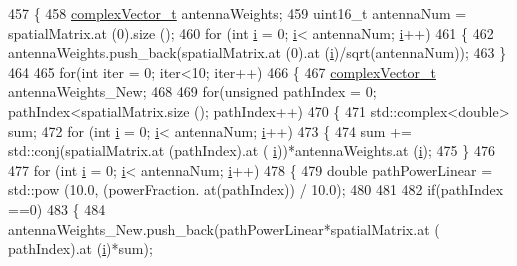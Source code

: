 \begin{DoxyCode}
457 \{
458         \hyperlink{namespacens3_a6a7f75817ae50e6ac47414955b17d926}{complexVector\_t} antennaWeights;
459         uint16\_t antennaNum = spatialMatrix.at (0).size ();
460         \textcolor{keywordflow}{for} (\textcolor{keywordtype}{int} \hyperlink{bernuolliDistribution_8m_a6f6ccfcf58b31cb6412107d9d5281426}{i} = 0; \hyperlink{bernuolliDistribution_8m_a6f6ccfcf58b31cb6412107d9d5281426}{i}< antennaNum; \hyperlink{bernuolliDistribution_8m_a6f6ccfcf58b31cb6412107d9d5281426}{i}++)
461         \{
462                 antennaWeights.push\_back(spatialMatrix.at (0).at (\hyperlink{bernuolliDistribution_8m_a6f6ccfcf58b31cb6412107d9d5281426}{i})/sqrt(antennaNum));
463         \}
464 
465         \textcolor{keywordflow}{for}(\textcolor{keywordtype}{int} iter = 0; iter<10; iter++)
466         \{
467                 \hyperlink{namespacens3_a6a7f75817ae50e6ac47414955b17d926}{complexVector\_t} antennaWeights\_New;
468 
469                 \textcolor{keywordflow}{for}(\textcolor{keywordtype}{unsigned} pathIndex = 0; pathIndex<spatialMatrix.size (); pathIndex++)
470                 \{
471                         std::complex<double> sum;
472                         \textcolor{keywordflow}{for} (\textcolor{keywordtype}{int} \hyperlink{bernuolliDistribution_8m_a6f6ccfcf58b31cb6412107d9d5281426}{i} = 0; \hyperlink{bernuolliDistribution_8m_a6f6ccfcf58b31cb6412107d9d5281426}{i}< antennaNum; \hyperlink{bernuolliDistribution_8m_a6f6ccfcf58b31cb6412107d9d5281426}{i}++)
473                         \{
474                                 sum += std::conj(spatialMatrix.at (pathIndex).at (
      \hyperlink{bernuolliDistribution_8m_a6f6ccfcf58b31cb6412107d9d5281426}{i}))*antennaWeights.at (\hyperlink{bernuolliDistribution_8m_a6f6ccfcf58b31cb6412107d9d5281426}{i});
475                         \}
476 
477                         \textcolor{keywordflow}{for} (\textcolor{keywordtype}{int} \hyperlink{bernuolliDistribution_8m_a6f6ccfcf58b31cb6412107d9d5281426}{i} = 0; \hyperlink{bernuolliDistribution_8m_a6f6ccfcf58b31cb6412107d9d5281426}{i}< antennaNum; \hyperlink{bernuolliDistribution_8m_a6f6ccfcf58b31cb6412107d9d5281426}{i}++)
478                         \{
479                 \textcolor{keywordtype}{double} pathPowerLinear = std::pow (10.0, (powerFraction. at(pathIndex)) / 10.0);
480 
481 
482                                 \textcolor{keywordflow}{if}(pathIndex ==0)
483                                 \{
484                                         antennaWeights\_New.push\_back(pathPowerLinear*spatialMatrix.at (
      pathIndex).at (\hyperlink{bernuolliDistribution_8m_a6f6ccfcf58b31cb6412107d9d5281426}{i})*sum);

\end{DoxyCode}
